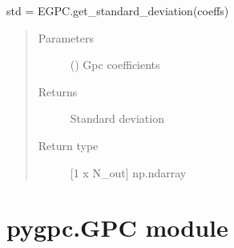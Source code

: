 \documentclass[letterpaper,10pt,english,openany,oneside]{sphinxmanual}
\begin{document}
\begin{fulllineitems}
\begin{fulllineitems}
std = EGPC.get\_standard\_deviation(coeffs)
\begin{quote}\begin{description}
\item[{Parameters}] \leavevmode
{} (\sphinxstyleliteralemphasis{\sphinxupquote{ {[}}}\sphinxstyleliteralemphasis{\sphinxupquote{{]}}}) \textendash{} Gpc coefficients

\item[{Returns}] \leavevmode
{} \textendash{} Standard deviation

\item[{Return type}] \leavevmode
{[}1 x N\_out{]} np.ndarray

\end{description}\end{quote}

\end{fulllineitems}


\end{fulllineitems}



\section{pygpc.GPC module}
\label{\detokenize{pygpc:module-pygpc.GPC}}\label{\detokenize{pygpc:pygpc-gpc-module}}
\end{document}
